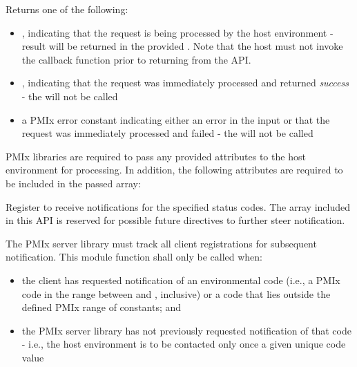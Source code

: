 \begin{arglist}
\end{arglist}

Returns one of the following:

\begin{itemize}
    \item {}, indicating that the request is being processed by the host environment - result will be returned in the provided . Note that the host must not invoke the callback function prior to returning from the \ac{API}.
    \item {}, indicating that the request was immediately processed and returned \textit{success} - the  will not be called
    \item a PMIx error constant indicating either an error in the input or that the request was immediately processed and failed - the  will not be called
\end{itemize}

\reqattrstart
\ac{PMIx} libraries are required to pass any provided attributes to the host environment for processing. In addition, the following attributes are required to be included in the passed  array:


\reqattrend

\descr

Register to receive notifications for the specified status codes. The  array included in this API is reserved for possible future directives to further steer notification.


\adviceimplstart
The \ac{PMIx} server library must track all client registrations for subsequent notification. This module function shall only be called when:

\begin{itemize}
    \item the client has requested notification of an environmental code (i.e., a \ac{PMIx} code in the range between  and , inclusive) or a code that lies outside the defined \ac{PMIx} range of constants; and
    \item the \ac{PMIx} server library has not previously requested notification of that code - i.e., the host environment is to be contacted only once a given unique code value
\end{itemize}

